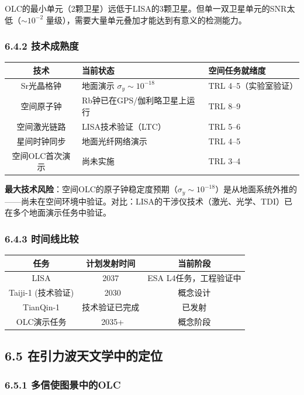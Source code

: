 \documentclass[12pt,a4paper]{article}
\begin{document}
OLC的最小单元（2颗卫星）远低于LISA的3颗卫星。但单一双卫星单元的SNR太低（$\sim 10^{-2}$ 量级），需要大量单元叠加才能达到有意义的检测能力。

\subsubsection{6.4.2 技术成熟度}


\begin{tabular}{|c|p{3.5cm}|p{3.5cm}|}
\hline
技术 & 当前状态 & 空间任务就绪度 \\
\hline
Sr光晶格钟 & 地面演示 $\sigma_y \sim 10^{-18}$ & TRL 4–5（实验室验证） \\
空间原子钟 & Rb钟已在GPS/伽利略卫星上运行 & TRL 8–9 \\
空间激光链路 & LISA技术验证（LTC） & TRL 5–6 \\
星间时钟同步 & 地面光纤网络演示 & TRL 4–5 \\
空间OLC首次演示 & 尚未实施 & TRL 3–4 \\
\hline
\end{tabular}


\textbf{最大技术风险}：空间OLC的原子钟稳定度预期（$\sigma_y \sim 10^{-18}$）是从地面系统外推的——尚未在空间环境中验证。对比：LISA的干涉仪技术（激光、光学、TDI）已在多个地面演示任务中验证。

\subsubsection{6.4.3 时间线比较}


\begin{tabular}{|c|c|c|}
\hline
任务 & 计划发射时间 & 当前阶段 \\
\hline
LISA & 2037 & ESA L4任务，工程验证中 \\
Taiji-1 (技术验证) & ~2030 & 概念设计 \\
TianQin-1 & 技术验证已完成 & 已发射 \\
OLC演示任务 & ~2035+ & 概念阶段 \\
\hline
\end{tabular}


\subsection{6.5 在引力波天文学中的定位}


\subsubsection{6.5.1 多信使图景中的OLC}
\end{document}
